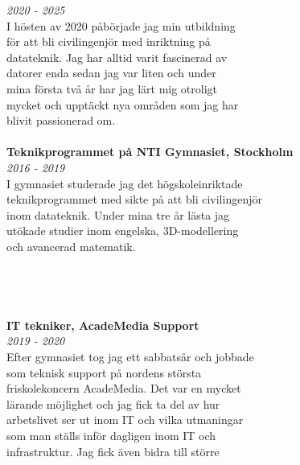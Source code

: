 \documentclass[11pt,oneside,a4paper,titlepage]{article}
\begin{document}
\begin{tcolorbox}
\begin{minipage}[t]{12cm}
\begin{tcolorbox}[grow to left by=-10pt,colframe=white,colback=white,sharp corners]
{                \emph{2020 - 2025} \\
                I hösten av 2020 påbörjade jag min utbildning\\
                för att bli civilingenjör med inriktning på\\
                datateknik. Jag har alltid varit fascinerad av\\
                datorer enda sedan jag var liten och under\\
                mina första två år har jag lärt mig otroligt\\
                mycket och upptäckt nya områden som jag har\\
                blivit passionerad om.\\\\
                \textbf{Teknikprogrammet på NTI Gymnasiet, Stockholm} \\
                \emph{2016 - 2019} \\
                I gymnasiet studerade jag det högskoleinriktade\\
                teknikprogrammet med sikte på att bli civilingenjör\\
                inom datateknik. Under mina tre år lästa jag\\
                utökade studier inom engelska, 3D-modellering\\
                och avancerad matematik.\\\\\\
                \\
                \\\textbf{IT tekniker, AcadeMedia Support}\\
                \emph{2019 - 2020}\\
                Efter gymnasiet tog jag ett sabbatsår och jobbade\\
                som teknisk support på nordens största\\
                friskolekoncern AcadeMedia. Det var en mycket\\
                lärande möjlighet och jag fick ta del av hur\\
                arbetslivet ser ut inom IT och vilka utmaningar\\
                som man ställs inför dagligen inom IT och\\
                infrastruktur. Jag fick även bidra till större\\
}
\end{tcolorbox}
\end{minipage}
\end{tcolorbox}
\end{document}

